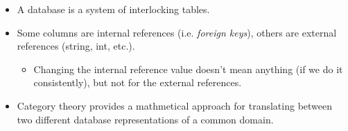 \begin{itemize}
    \item A database is a system of interlocking tables.
    \item Some columns are internal references (i.e. \emph{foreign keys}), others are external references (string, int, etc.).
          \begin{itemize}
            \item Changing the internal reference value doesn't mean anything (if we do it consistently), but not for the external references.
          \end{itemize}
    \item Category theory provides a mathmetical approach for translating between two different database representations of a common domain.
  \end{itemize}
